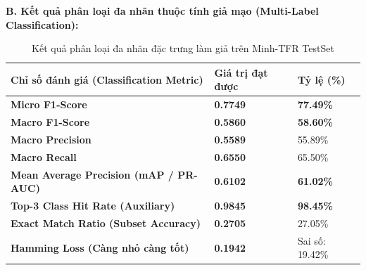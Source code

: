 \textbf{B. Kết quả phân loại đa nhãn thuộc tính giả mạo (Multi-Label Classification):}
\begin{table}[H]
    \centering
    \caption{Kết quả phân loại đa nhãn đặc trưng làm giả trên Minh-TFR TestSet}
    \label{tab:test_cls_results}
    \vspace{0.2cm}
    \renewcommand{\arraystretch}{1.3}
    \begin{tabular}{|m{6.5cm}|m{4cm}|m{3.5cm}|}
        \hline
        \textbf{Chỉ số đánh giá (Classification Metric)} & \textbf{Giá trị đạt được} & \textbf{Tỷ lệ (\%)} \\
        \hline
        \textbf{Micro F1-Score} & \textbf{0.7749} & \textbf{77.49\%} \\
        \hline
        \textbf{Macro F1-Score} & \textbf{0.5860} & \textbf{58.60\%} \\
        \hline
        \textbf{Macro Precision} & \textbf{0.5589} & 55.89\% \\
        \hline
        \textbf{Macro Recall} & \textbf{0.6550} & 65.50\% \\
        \hline
        \textbf{Mean Average Precision (mAP / PR-AUC)} & \textbf{0.6102} & \textbf{61.02\%} \\
        \hline
        \textbf{Top-3 Class Hit Rate (Auxiliary)} & \textbf{0.9845} & \textbf{98.45\%} \\
        \hline
        \textbf{Exact Match Ratio (Subset Accuracy)} & \textbf{0.2705} & 27.05\% \\
        \hline
        \textbf{Hamming Loss (Càng nhỏ càng tốt)} & \textbf{0.1942} & Sai số: 19.42\% \\
        \hline
    \end{tabular}
\end{table}

